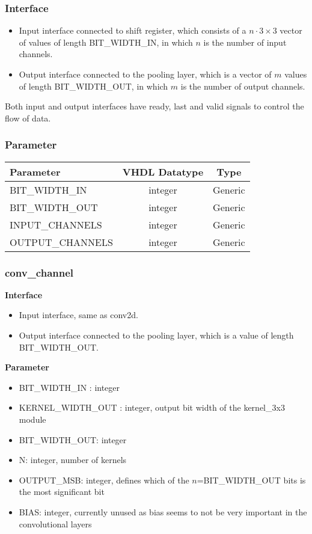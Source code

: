 \subsubsection{Interface}

\begin{itemize}
	\item Input interface connected to shift register, which consists of a $n \cdot 3 \times 3$ vector of values of length BIT\_WIDTH\_IN, in which $n$ is the number of input channels.
	\item Output interface connected to the pooling layer, which is a vector of $m$ values of length BIT\_WIDTH\_OUT, in which $m$ is the number of output channels.
\end{itemize}
Both input and output interfaces have ready, last and valid signals to control the flow of data.

\subsubsection{Parameter}

\begin{table}[hb]
	\centering
	\begin{tabular}{lcc}
		\toprule
		Parameter & VHDL Datatype & Type \\
		\midrule
		 BIT\_WIDTH\_IN & integer & Generic\\
		 BIT\_WIDTH\_OUT & integer & Generic \\
		 INPUT\_CHANNELS & integer & Generic\\
 	 	 OUTPUT\_CHANNELS & integer & Generic \\
		\bottomrule
	\end{tabular}
\end{table}




\subsubsection*{conv\_channel}


\textbf{Interface}
\begin{itemize}
	\item Input interface, same as conv2d.
	\item Output interface connected to the pooling layer, which is a value of length BIT\_WIDTH\_OUT.
\end{itemize}

\textbf{Parameter}
\begin{itemize}
 	\item BIT\_WIDTH\_IN : integer
 	\item KERNEL\_WIDTH\_OUT : integer, output bit width of the kernel\_3x3 module
 	\item BIT\_WIDTH\_OUT: integer
 	\item N: integer, number of kernels
 	\item OUTPUT\_MSB: integer, defines which of the $n$=BIT\_WIDTH\_OUT bits is the most significant bit
 	\item BIAS: integer, currently unused as bias seems to not be very important in the convolutional layers
\end{itemize}

